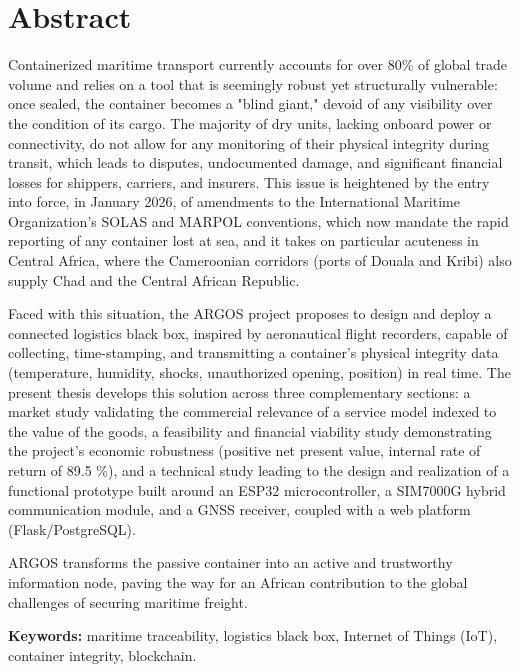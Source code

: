 \cleardoublepage
\chapter*{Abstract}

Containerized maritime transport currently accounts for over 80\% of global trade volume and relies on a tool that is seemingly robust yet structurally vulnerable: once sealed, the container becomes a "blind giant," devoid of any visibility over the condition of its cargo. The majority of dry units, lacking onboard power or connectivity, do not allow for any monitoring of their physical integrity during transit, which leads to disputes, undocumented damage, and significant financial losses for shippers, carriers, and insurers. This issue is heightened by the entry into force, in January 2026, of amendments to the International Maritime Organization's SOLAS and MARPOL conventions, which now mandate the rapid reporting of any container lost at sea, and it takes on particular acuteness in Central Africa, where the Cameroonian corridors (ports of Douala and Kribi) also supply Chad and the Central African Republic.

Faced with this situation, the ARGOS project proposes to design and deploy a connected logistics black box, inspired by aeronautical flight recorders, capable of collecting, time-stamping, and transmitting a container's physical integrity data (temperature, humidity, shocks, unauthorized opening, position) in real time. The present thesis develops this solution across three complementary sections: a market study validating the commercial relevance of a service model indexed to the value of the goods, a feasibility and financial viability study demonstrating the project's economic robustness (positive net present value, internal rate of return of 89.5 \%), and a technical study leading to the design and realization of a functional prototype built around an ESP32 microcontroller, a SIM7000G hybrid communication module, and a GNSS receiver, coupled with a web platform (Flask/PostgreSQL).

ARGOS transforms the passive container into an active and trustworthy information node, paving the way for an African contribution to the global challenges of securing maritime freight.

\vspace{1cm}\noindent 

\textbf{Keywords:} maritime traceability, logistics black box, Internet of Things (IoT), container integrity, blockchain.
